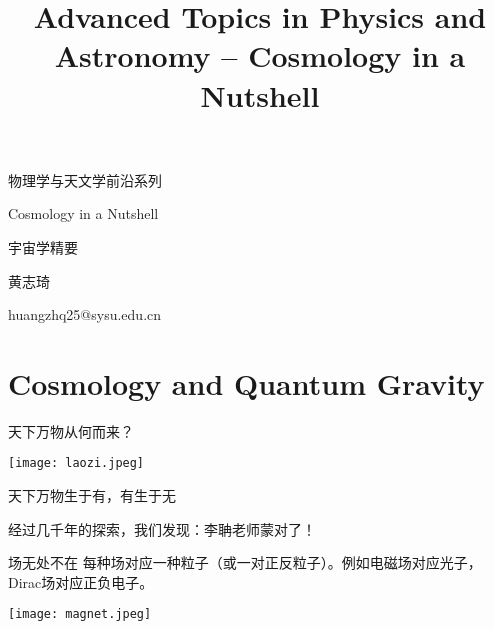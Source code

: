\documentclass[CJK]{beamer}
\title{Advanced Topics in Physics and Astronomy -- Cosmology in a Nutshell}
\author{}
\date{}
\begin{document}
\begin{frame}
 
\begin{center}
\bch
\begin{Large}
物理学与天文学前沿系列

\skipline
Cosmology in a Nutshell

\skipline
宇宙学精要 


\end{Large}
\skipline
黄志琦  

huangzhq25@sysu.edu.cn
\ech
\end{center}
\end{frame}


\section{Cosmology and Quantum Gravity}
\begin{frame}
\bch
天下万物从何而来？
\ech
\end{frame}

\begin{frame}
\bch
\begin{minipage}{0.45\textwidth}
\texttt{[image: laozi.jpeg]}
\end{minipage}
\begin{minipage}{0.45\textwidth}
天下万物生于有，有生于无
\end{minipage}
\ech
\end{frame}

\begin{frame}
\chtitle{}
\bch
经过几千年的探索，我们发现：李聃老师蒙对了！
\ech
\end{frame}

\begin{frame}
\bch
\begin{minipage}{0.5\textwidth}
场无处不在
\skipline
每种场对应一种粒子（或一对正反粒子）。例如电磁场对应光子，Dirac场对应正负电子。
\end{minipage}
\begin{minipage}{0.4\textwidth}
\texttt{[image: magnet.jpeg]}
\end{minipage}
\ech
\end{frame}
\end{document}
